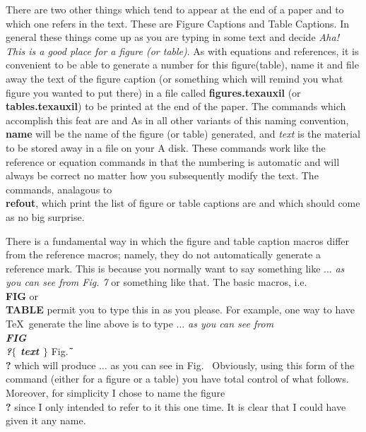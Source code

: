 There are two other things which tend to appear at the end
of a paper and to which one refers in the text.
These are Figure Captions and Table Captions.
In general these things come up as you are typing
in some text and decide {\it Aha! This is a good place for a figure
(or table)}.
As with equations and references, it is convenient to be able
to generate a number for this figure(table), name it and file
away the text of the figure caption (or something which will remind
you what figure you wanted to put there) in a file called
{\bf figures.texauxil} (or {\bf tables.texauxil}) to be printed
at the end of the paper.
The commands which accomplish this feat are
and
As in all other variants of this naming convention,
{\bf \\name} will be the name of the figure (or table)
generated, and {\it text} is the material to be stored away
in a file on your A disk.
These commands work like the reference or equation commands
in that the numbering is automatic and
will always be correct no matter how you subsequently modify the
text.
The commands, analagous to {\bf \\refout}, which print the
list of figure or table captions are
\tc{\\figout}
and
\tc{\\tabout}
which should come as no big surprise.
 
There is a fundamental way in which the figure and table caption
macros differ from the reference macros; namely, they do not
automatically generate a reference mark.
This is because you normally want to say something like \nextline
$\ldots$ {\it as you can see from Fig. 7 } \nextline
or something like that.
The basic macros, i.e. {\bf \\FIG} or {\bf \\TABLE} permit
you to type this in as you please.
For example, one way to have \TeX\ generate the line above
is to type \nextline {}
{$\ldots $ \it as you can see from \bf \\FIG\\?$\{$ \it text
\bf $\}$} Fig.{\bf \~\ \\?} \nextline
which will produce  \nextline
$\ldots $ as you can see in  Fig.~\? \nextline
Obviously, using this form of the command (either for a figure or
a table) you have total control of what follows.
Moreover, for simplicity I chose to name the figure {\bf \\?}
since I only intended to refer to it this one time.
It is clear that I could have given it any name.
 
